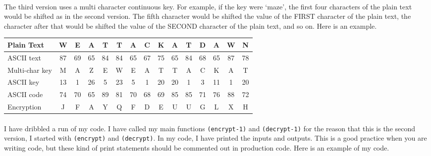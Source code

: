 \documentclass{article}
\begin{document}
\paragraph{}The third version uses a multi character continuous key. For example, if the key were `maze', the first four characters of the plain text would be shifted as in the second version. The fifth character would be shifted the value of the FIRST character of the plain text, the character after that would be shifted the value of the SECOND character of the plain text, and so on. Here is an example.

\footnotesize{
\begin{longtable}{|p{.75in}|c|c|c|c|c|c|c|c|c|c|c|c|c|c|}
\hline
Plain Text & W & E & A & T & T & A & C & K & A & T & D & A & W & N  \\
\hline
ASCII text &87 & 69 & 65 & 84 & 84 & 65 & 67 & 75 & 65 & 84 & 68 & 65 & 87 & 78 \\
\hline
Multi-char key & M & A & Z & E & W & E & A & T & T & A & C & K & A & T \\
\hline
ASCII key & 13 & 1 & 26 & 5 & 23 & 5 & 1 & 20 & 20 & 1 & 3 & 11 & 1 & 20 \\
\hline
ASCII code & 74 & 70 & 65 & 89 & 81 & 70 & 68 & 69 & 85 & 85 & 71 & 76 & 88 & 72 \\
\hline
Encryption & J & F & A & Y & Q & F & D & E & U & U & G & L & X & H \\
\hline
\end{longtable}
}

\paragraph{}I have dribbled a run of my code. I have called my main functions \texttt{(encrypt-1)} and \texttt{(decrypt-1)} for the reason that this is the second version, I started with \texttt{(encrypt)} and \texttt{(decrypt)}.  In my code, I have printed the inputs and outputs. This is a good practice when you are writing code, but these kind of print statements should be commented out in production code. Here is an example of my code.
\end{document}
